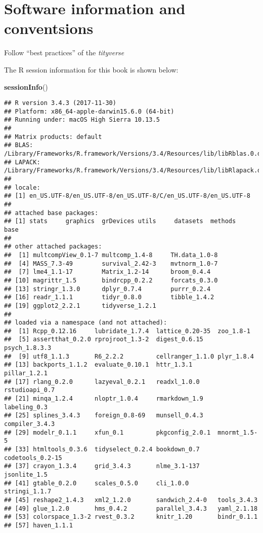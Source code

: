 \documentclass[]{book}
\newenvironment{Shaded}{\begin{snugshade}}{\end{snugshade}}
\newcommand{\KeywordTok}[1]{\textcolor[rgb]{0.13,0.29,0.53}{\textbf{#1}}}
\newcommand{\NormalTok}[1]{#1}
\theoremstyle{definition}
\theoremstyle{definition}
\theoremstyle{definition}
\theoremstyle{remark}
\begin{document}
\hypertarget{software-information-and-conventsions}{%
\section*{Software information and
conventsions}\label{software-information-and-conventsions}}

Follow ``best practices'' of the \emph{tityverse}

The R session information for this book is shown below:

\begin{Shaded}
\begin{Highlighting}[]
\KeywordTok{sessionInfo}\NormalTok{()}
\end{Highlighting}
\end{Shaded}

\begin{verbatim}
## R version 3.4.3 (2017-11-30)
## Platform: x86_64-apple-darwin15.6.0 (64-bit)
## Running under: macOS High Sierra 10.13.5
## 
## Matrix products: default
## BLAS: /Library/Frameworks/R.framework/Versions/3.4/Resources/lib/libRblas.0.dylib
## LAPACK: /Library/Frameworks/R.framework/Versions/3.4/Resources/lib/libRlapack.dylib
## 
## locale:
## [1] en_US.UTF-8/en_US.UTF-8/en_US.UTF-8/C/en_US.UTF-8/en_US.UTF-8
## 
## attached base packages:
## [1] stats     graphics  grDevices utils     datasets  methods   base     
## 
## other attached packages:
##  [1] multcompView_0.1-7 multcomp_1.4-8     TH.data_1.0-8     
##  [4] MASS_7.3-49        survival_2.42-3    mvtnorm_1.0-7     
##  [7] lme4_1.1-17        Matrix_1.2-14      broom_0.4.4       
## [10] magrittr_1.5       bindrcpp_0.2.2     forcats_0.3.0     
## [13] stringr_1.3.0      dplyr_0.7.4        purrr_0.2.4       
## [16] readr_1.1.1        tidyr_0.8.0        tibble_1.4.2      
## [19] ggplot2_2.2.1      tidyverse_1.2.1   
## 
## loaded via a namespace (and not attached):
##  [1] Rcpp_0.12.16     lubridate_1.7.4  lattice_0.20-35  zoo_1.8-1       
##  [5] assertthat_0.2.0 rprojroot_1.3-2  digest_0.6.15    psych_1.8.3.3   
##  [9] utf8_1.1.3       R6_2.2.2         cellranger_1.1.0 plyr_1.8.4      
## [13] backports_1.1.2  evaluate_0.10.1  httr_1.3.1       pillar_1.2.1    
## [17] rlang_0.2.0      lazyeval_0.2.1   readxl_1.0.0     rstudioapi_0.7  
## [21] minqa_1.2.4      nloptr_1.0.4     rmarkdown_1.9    labeling_0.3    
## [25] splines_3.4.3    foreign_0.8-69   munsell_0.4.3    compiler_3.4.3  
## [29] modelr_0.1.1     xfun_0.1         pkgconfig_2.0.1  mnormt_1.5-5    
## [33] htmltools_0.3.6  tidyselect_0.2.4 bookdown_0.7     codetools_0.2-15
## [37] crayon_1.3.4     grid_3.4.3       nlme_3.1-137     jsonlite_1.5    
## [41] gtable_0.2.0     scales_0.5.0     cli_1.0.0        stringi_1.1.7   
## [45] reshape2_1.4.3   xml2_1.2.0       sandwich_2.4-0   tools_3.4.3     
## [49] glue_1.2.0       hms_0.4.2        parallel_3.4.3   yaml_2.1.18     
## [53] colorspace_1.3-2 rvest_0.3.2      knitr_1.20       bindr_0.1.1     
## [57] haven_1.1.1
\end{verbatim}
\end{document}
